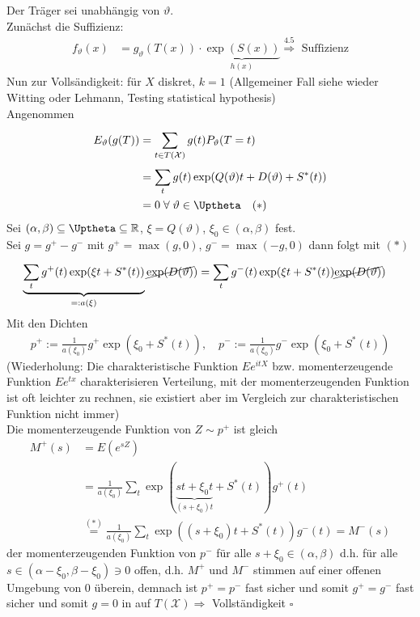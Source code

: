 \documentclass[a4paper,openany]{book}
\theoremstyle{mytheoremstyle}
\theoremstyle{mytheoremstyle2}
\newtheorem*{cbew}{Beweis}
\newenvironment{bew}[1][]{%
  \ifthenelse{\boolean{showbew}}{%
    \begin{cbew}[#1]%
  }{%
    \expandafter\comment%
  }%
}{%
  \ifthenelse{\boolean{showbew}}{%
    \end{cbew}%
  }{%
    \expandafter\endcomment%
  }%
}
\begin{document}
\begin{bew}[]
  Der Träger sei unabhängig von $\vartheta $. \\ 
  Zunächst die Suffizienz:
  \begin{align*}
    f _{\vartheta }(x)
    &=g _{\vartheta }(T(x))\cdot \underbrace{\exp(S(x))}_{h(x)}\overset{4.5}\Rightarrow \text{ Suffizienz}
  \end{align*}
  Nun zur Vollsändigkeit: für $X$ diskret, $k=1$ (Allgemeiner Fall siehe wieder Witting oder Lehmann, Testing statistical hypothesis) \\
  Angenommen 
  \begin{align*}
    E _{\vartheta }(g(T))
    &=\sum_{t \in T(\mathcal{X})}^{}{g(t)P _{\vartheta }(T=t)}\\
    &=\sum_{t}^{}{g(t)\exp(Q(\vartheta )t+D(\vartheta )+S^*(t))} \\
    &=0\;\forall\;\vartheta \in \Uptheta\quad (*)
  \end{align*}
  Sei $(\alpha ,\beta ) \subseteq \Uptheta \subseteq \mathbb{R}$, $\xi =Q(\vartheta )$, $\xi_0 \in (\alpha ,\beta )$ fest. \\
  Sei $g=g^+-g^-$ mit $g^+=\max(g,0)$, $g^-=\max(-g,0)$ dann folgt mit $(*)$
  \begin{align*}
    \underbrace{\sum_{t}^{}{g^+(t)\exp(\xi t+S^*(t))}}_{=:a(\xi)}\cancel{\exp(D(\vartheta )})
    &=\sum_{t}^{}{g^-(t)\exp(\xi t+S^*(t))}\cancel{\exp(D(\vartheta )})
  \end{align*}
Mit den Dichten
\begin{align*}
  p^+:=\frac{1}{a(\xi_0)}g^+\exp(\xi_0+S^*(t)),\quad p^-:=\frac{1}{a(\xi_0)}g^-\exp(\xi_0+S^*(t))
\end{align*}
(Wiederholung: Die charakteristische Funktion $Ee^{itX}$ bzw. momenterzeugende Funktion $Ee^{tx}$ charakterisieren Verteilung, mit der momenterzeugenden Funktion ist oft leichter zu rechnen, sie existiert aber im Vergleich zur charakteristischen Funktion nicht immer) \\
Die momenterzeugende Funktion von $Z\sim p^+$ ist gleich
\begin{align*}
  M^+(s)
  &=E(e^{sZ}) \\
  &=\frac{1}{a(\xi_0)}\sum_{t}^{}{\exp(\underbrace{st+\xi_0t}_{(s+\xi_0)t}+S^*(t))g^+(t)}\\
  &\overset{(*)}=\frac{1}{a(\xi_0)}\sum_{t}^{}{\exp((s+\xi_0)t+S^*(t))g^-(t)}=M^-(s)
\end{align*}
der momenterzeugenden Funktion von $p^-$ für alle $s+\xi_0 \in (\alpha ,\beta )$ d.h. für alle $s \in (\alpha -\xi_0,\beta -\xi_0)\ni 0$ offen, d.h. $M^+$ und $M^-$ stimmen auf einer offenen Umgebung von $0$ überein, demnach ist $p^+=p^-$ fast sicher und somit $g^+=g^-$ fast sicher und somit $g=0$ in auf $T(\mathcal{X})\Rightarrow $ Vollständigkeit $\square$ 
\end{bew}
\end{document}

